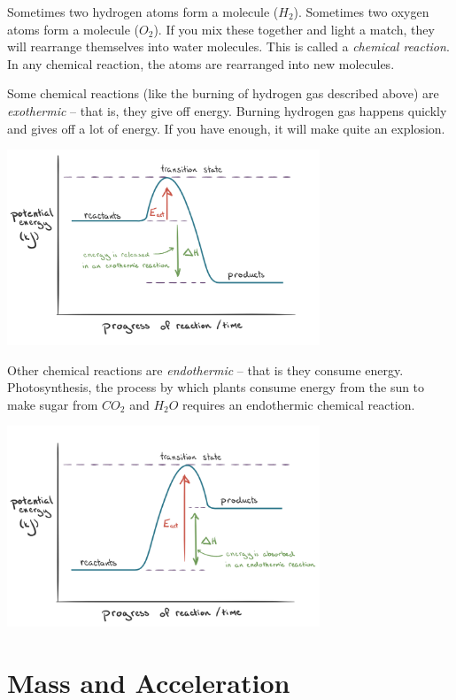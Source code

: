Sometimes two hydrogen atoms form a molecule ($H_2$). Sometimes two
oxygen atoms form a molecule ($O_2$). If you mix these
together and light a match, they will rearrange themselves into water
molecules. This is called a \textit{chemical reaction}.  In any
chemical reaction, the atoms are rearranged into new molecules.

Some chemical reactions (like the burning of hydrogen gas described
above) are \textit{exothermic} -- that is, they give off energy.
Burning hydrogen gas happens quickly and gives off a lot of energy. If
you have enough, it will make quite an explosion.

\includegraphics[width=0.7\textwidth]{KA_Exo.png}

Other chemical reactions are \textit{endothermic} -- that is they consume
energy.  Photosynthesis, the process by which plants consume energy
from the sun to make sugar from $CO_2$ and $H_2O$ requires an endothermic
chemical reaction.

\includegraphics[width=0.7\textwidth]{KA_Endo.png}

\section{Mass and Acceleration}

